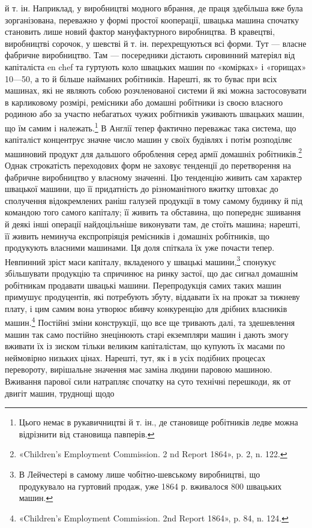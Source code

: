 \parcont{}  %
й т. ін. Наприклад, у виробництві модного вбрання, де праця
здебільша вже була зорганізована, переважно у формі простої
кооперації, швацька машина спочатку становить лише новий
фактор мануфактурного виробництва. В кравецтві, виробництві
сорочок, у шевстві й т. ін. перехрещуються всі форми. Тут —
власне фабричне виробництво. Там — посередники дістають сировинний
матеріял від капіталіста en chef та гуртують коло швацьких
машин по «комірках» і «горищах» 10—50, а то й більше найманих
робітників. Нарешті, як то буває при всіх машинах, які не
являють собою розчленованої системи й які можна застосовувати
в карликовому розмірі, ремісники або домашні робітники із
своєю власного родиною або за участю небагатьох чужих робітників
уживають швацьких машин, що їм самим і належать.\footnote{
Цього немає в рукавичництві й т. ін., де становище робітників
ледве можна відрізнити від становища павперів.
}
В Англії тепер фактично переважає така система, що капіталіст
концентрує значне число машин у своїх будівлях і потім розподіляє
машиновий продукт для дальшого оброблення серед армії
домашніх робітників.\footnote{
«Children’s Employment Commission. 2 nd Report 1864», p. 2,
n. 122.
} Однак строкатість переходових форм
не заховує тенденції до перетворення на фабричне виробництво
у власному значенні. Цю тенденцію живить сам характер швацької
машини, що її придатність до різноманітного вжитку штовхає
до сполучення відокремлених раніш галузей продукції в
тому самому будинку й під командою того самого капіталу; її
живить та обставина, що попереднє зшивання й деякі інші операції
найдоцільніше виконувати там, де стоїть машина; нарешті,
її живить неминуча експропріяція ремісників і домашніх робітників,
що продукують власними машинами. Ця доля спіткала
їх уже почасти тепер. Невпинний зріст маси капіталу, вкладеного
у швацькі машини,\footnote{
В Лейчестері в самому лише чобітно-шевському виробництві,
що продукувало на гуртовий продаж, уже 1864 р. вживалося 800 швацьких
машин.
} спонукує збільшувати продукцію та спричинює
на ринку застої, що дає сигнал домашнім робітникам продавати
швацькі машини. Перепродукція самих таких машин примушує
продуцентів, які потребують збуту, віддавати їх на прокат
за тижневу плату, і цим самим вона утворює вбивчу конкуренцію
для дрібних власників машин.\footnote{
«Children’s Employment Commission. 2nd Report 1864», p. 84,
n. 124.
} Постійні зміни конструкції,
що все ще тривають далі, та здешевлення машин так само постійно
знецінюють старі екземпляри машин і дають змогу вживати їх
із зиском тільки великим капіталістам, що купують їх масами
по неймовірно низьких цінах. Нарешті, тут, як і в усіх подібних
процесах перевороту, вирішальне значення має заміна людини
паровою машиною. Вживання парової сили натрапляє спочатку
на суто технічні перешкоди, як от двигіт машин, труднощі щодо
\parbreak{}  %
